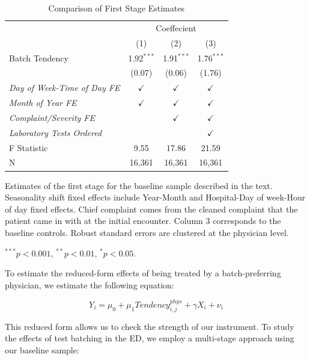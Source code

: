 \documentclass{article}
\begin{document}
\begin{table}[!htbp] \centering 
  \caption{Comparison of First Stage Estimates}
  \label{table:first_stage}
  \begin{tabularx}{5.5in}{Xccc} %
  \toprule
   & \multicolumn{3}{c}{Coeffecient} \\
  \cmidrule{2-4}
   & (1) & (2) & (3) \\
  \midrule
  Batch Tendency & 1.92$^{***}$ & 1.91$^{***}$ & 1.76$^{***}$ \\ 
   & (0.07) & (0.06) & (1.76) \\ 
  \textit{Day of Week-Time of Day FE} & $\checkmark$ & $\checkmark$ & $\checkmark$ \\
  \textit{Month of Year FE} & $\checkmark$ & $\checkmark$ & $\checkmark$ \\
  \textit{Complaint/Severity FE} & & $\checkmark$ & $\checkmark$ \\
  \textit{Laboratory Tests Ordered} & & & $\checkmark$ \\
  \midrule
  F Statistic & 9.55 & 17.86 & 21.59 \\ 
  N & 16,361 & 16,361 & 16,361 \\ 
  \bottomrule
  \end{tabularx}
  \begin{tablenotes}
  \small
  \item Estimates of the first stage for the baseline sample described in the text. Seasonality shift fixed effects include Year-Month and Hospital-Day of week-Hour of day fixed effects. Chief complaint comes from the cleaned complaint that the patient came in with at the initial encounter. Column 3 corresponds to the baseline controls. Robust standard errors are clustered at the physician level.
  \item $^{***} p < 0.001$, $^{**} p < 0.01$, $^{*} p < 0.05$.
  \end{tablenotes}
\end{table}

To estimate the reduced-form effects of being treated by a
batch-preferring physician, we estimate the following equation:

\begin{equation}
Y_i = \mu_0 + \mu_1 Tendency_{i,j}^{phys} + \gamma X_i + \nu_i
\end{equation}

This reduced form allows us to check the strength of our instrument. To
study the effects of test batching in the ED, we employ a multi-stage
approach using our baseline sample:
\end{document}
